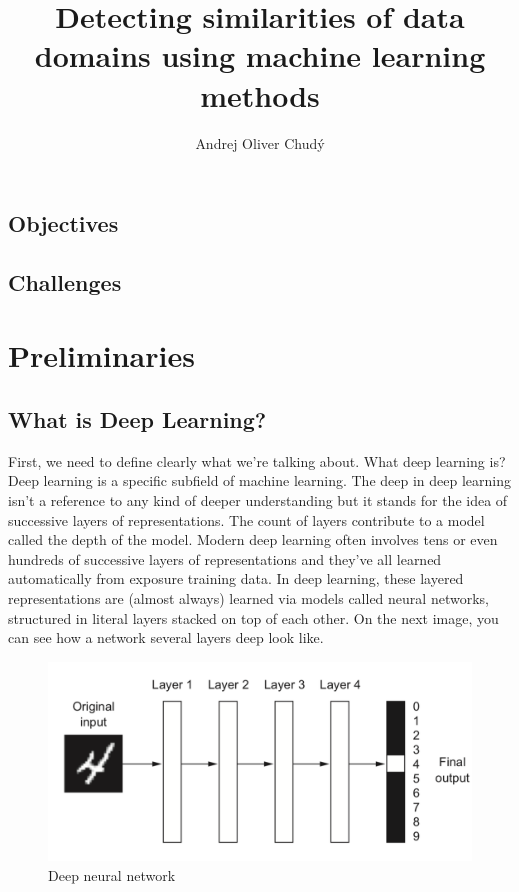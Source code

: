 \documentclass[thesis=M,english]{FITthesis}[2012/10/20]
\title{Detecting similarities of data domains using machine learning methods}
\author{Andrej Oliver Chud\'y}
\begin{document}
\begin{introduction}

	\section{Objectives}

	\section{Challenges}

\end{introduction}

\chapter{Preliminaries}

\section{What is Deep Learning?}
First, we need to define clearly what we're talking about. What deep learning is? Deep learning is a specific subfield of machine learning. The deep in deep learning isn't a reference to any kind of deeper understanding but it stands for the idea of successive layers of representations. The count of layers contribute to a model called the depth of the model. Modern deep learning often involves tens or even hundreds of successive layers of representations and they've all learned automatically from exposure training data. In deep learning, these layered representations are (almost always) learned via models called neural networks, structured in literal layers stacked on top of each other. On the next image, you can see how a network several layers deep look like. \cite{DLwP}


\begin{figure}\centering
	\includegraphics[scale=0.6]{images/deep_NN}
	\caption{Deep neural network}\label{fig:deep NN}
\end{figure}
\end{document}
